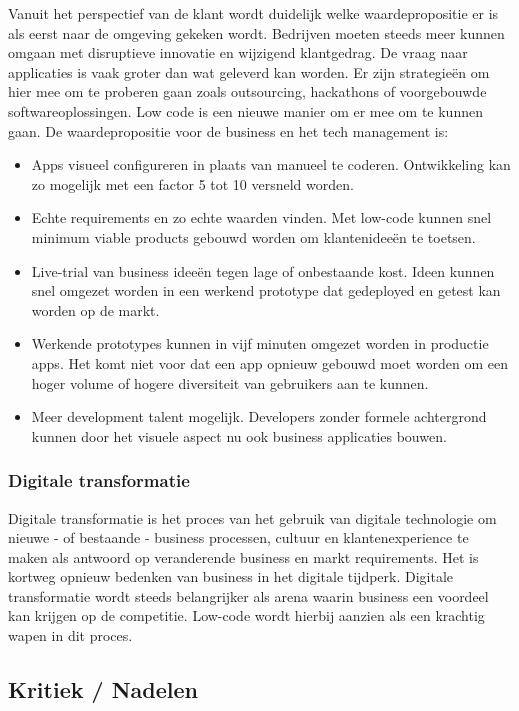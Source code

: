 Vanuit het perspectief van de klant wordt duidelijk welke waardepropositie er is als eerst naar de omgeving gekeken wordt. Bedrijven moeten steeds meer kunnen omgaan met disruptieve innovatie en wijzigend klantgedrag. De vraag naar applicaties is vaak groter dan wat geleverd kan worden. Er zijn strategieën om hier mee om te proberen gaan zoals outsourcing, hackathons of voorgebouwde softwareoplossingen. Low code is een nieuwe manier om er mee om te kunnen gaan. De waardepropositie voor de business en het tech management is:
\begin{itemize}
    \item Apps visueel configureren in plaats van manueel te coderen. Ontwikkeling kan zo mogelijk met een factor 5 tot 10 versneld worden.
    \item Echte requirements en zo echte waarden vinden. Met low-code kunnen snel minimum viable products gebouwd worden om klantenideeën te toetsen.
    \item Live-trial van business ideeën tegen lage of onbestaande kost. Ideen kunnen snel omgezet worden in een werkend prototype dat gedeployed en getest kan worden op de markt.
    \item Werkende prototypes kunnen in vijf minuten omgezet worden in productie apps. Het komt niet voor dat een app opnieuw gebouwd moet worden om een hoger volume of hogere diversiteit van gebruikers aan te kunnen.
    \item Meer development talent mogelijk. Developers zonder formele achtergrond kunnen door het visuele aspect nu ook business applicaties bouwen.
\end{itemize} \autocite{Richardson2016}

\subsubsection{Digitale transformatie}

Digitale transformatie is het proces van het gebruik van digitale technologie om nieuwe - of bestaande - business processen, cultuur en klantenexperience te maken als antwoord op veranderende business en markt requirements. Het is kortweg opnieuw bedenken van business in het digitale tijdperk. \autocite{Salesforce}
Digitale transformatie wordt steeds belangrijker als arena waarin business een voordeel kan krijgen op de competitie. Low-code wordt hierbij aanzien als een krachtig wapen in dit proces.

\subsection{Kritiek / Nadelen}

